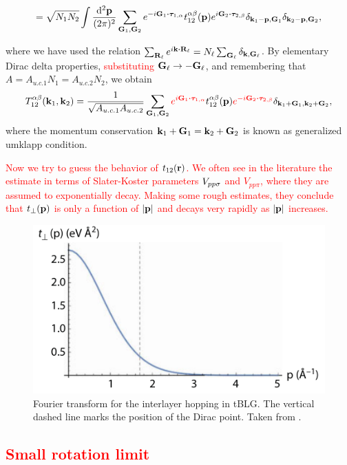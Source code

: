 $$
= \sqrt{N_1 N_2} \int \frac{\dd[2]{\p}}{(2\pi)^2}
\sum_{\G_1, \G_2} e^{-i\G_1\vdot\vtau_{1,\alpha}} t_{12}^{\alpha\beta}(\p)
e^{i\G_2\vdot\vtau_{2,\beta}} \delta_{\k_1-\p,\G_1} \delta_{\k_2-\p,\G_2},
$$

where we have used the relation $\sum_{\R_\ell} e^{i\k\vdot\R_\ell} = N_\ell \sum_{\G_\ell} \delta_{\k,\G_\ell}$. By elementary Dirac delta properties, \textcolor{red}{substituting ${\vb{G}}_\ell \to -{\vb{G}}_\ell$}, and remembering that $A = A_{u.c.1} N_1 = A_{u.c.2} N_2$, we obtain
\begin{equation} \label{eq:interlayer-hopping-simplified}
T_{12}^{\alpha\beta}(\k_1,\k_2) = \frac{1}{\sqrt{A_{u.c.1} A_{u.c.2}}}
\sum_{\G_1, \G_2} \textcolor{red}{e^{i\G_1\vdot\vtau_{1,\alpha}}} t_{12}^{\alpha\beta}(\p)
\textcolor{red}{e^{-i\G_2\vdot\vtau_{2,\beta}}} \delta_{\k_1+\G_1, \k_2+\G_2},
\end{equation}
where the momentum conservation $ {\vb{k}}_1 + {\vb{G}}_1 = {\vb{k}}_2 + {\vb{G}}_2 $ is known as generalized umklapp condition.

\n

\textcolor{red}{
Now we try to guess the behavior of $t_{12}({\vb{r}})$. We often see in the literature the estimate in terms of Slater-Koster parameters $V_{pp\sigma}$ and $V_{pp\pi}$, where they are assumed to exponentially decay. Making some rough estimates, they conclude that $t_\perp({\vb{p}})$ is only a function of $\abs{{\vb{p}}}$ and decays very rapidly as $\abs{{\vb{p}}}$ increases.
}

\begin{figure}[H]
\centering
\includegraphics[width=0.6\linewidth]{fig/tperp.png}
\caption{Fourier transform for the interlayer hopping in tBLG. The vertical dashed line marks the position
of the Dirac point. Taken from \cite{handbook2019}.}
\label{fig:tperp}
\end{figure}

\subsection{\textcolor{red}{Small rotation limit}}

